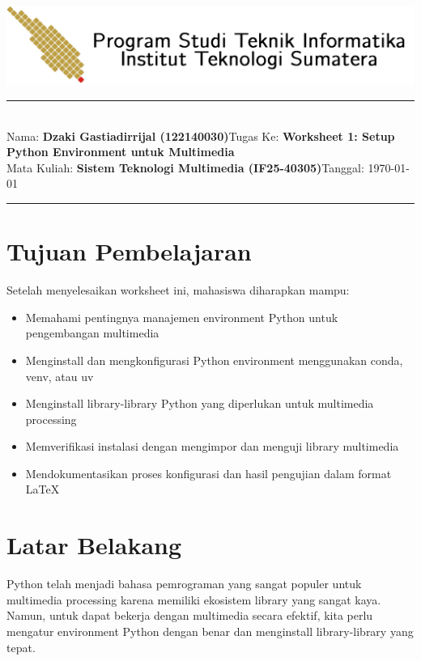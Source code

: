 \documentclass[11pt,a4paper]{article}
\newcommand{\student}{\textbf{Dzaki Gastiadirrijal (122140030)}}
\newcommand{\course}{\textbf{Sistem Teknologi Multimedia (IF25-40305)}}
\newcommand{\assignment}{\textbf{Worksheet 1: Setup Python Environment untuk Multimedia}}
\begin{document}
\thispagestyle{empty}
\begin{center}
	\includegraphics[scale = 0.15]{Figure/ifitera-header.png}
	\vspace{0.1cm}
\end{center}
\noindent
\rule{17cm}{0.2cm}\\[0.3cm]
Nama: \student \hfill Tugas Ke: \assignment\\[0.1cm]
Mata Kuliah: \course \hfill Tanggal: \today\\
\rule{17cm}{0.05cm}
\vspace{0.1cm}



\section{Tujuan Pembelajaran}
Setelah menyelesaikan worksheet ini, mahasiswa diharapkan mampu:
\begin{itemize}
    \item Memahami pentingnya manajemen environment Python untuk pengembangan multimedia
    \item Menginstall dan mengkonfigurasi Python environment menggunakan conda, venv, atau uv
    \item Menginstall library-library Python yang diperlukan untuk multimedia processing
    \item Memverifikasi instalasi dengan mengimpor dan menguji library multimedia
    \item Mendokumentasikan proses konfigurasi dan hasil pengujian dalam format \LaTeX
\end{itemize}

\section{Latar Belakang}
Python telah menjadi bahasa pemrograman yang sangat populer untuk multimedia processing karena memiliki ekosistem library yang sangat kaya. Namun, untuk dapat bekerja dengan multimedia secara efektif, kita perlu mengatur environment Python dengan benar dan menginstall library-library yang tepat.
\end{document}
